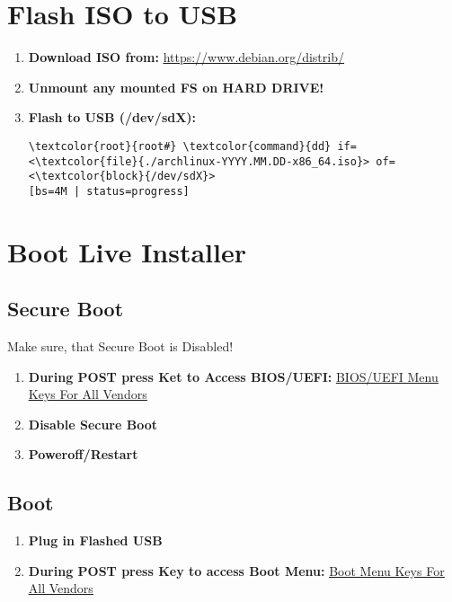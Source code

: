 \documentclass[10pt, a4paper, onecolumn, openany]{book} %
\begin{document}
\section{Flash ISO to USB}
\begin{enumerate}
    \item \textbf{Download ISO from:}
    \newline \underline{\url{https://www.debian.org/distrib/}}
    \item \textbf{Unmount any mounted FS on HARD DRIVE!}
    \item \textbf{Flash to USB (/dev/sdX):}
\begin{Verbatim}[commandchars=\\\{\}]
\textcolor{root}{root#} \textcolor{command}{dd} if=<\textcolor{file}{./archlinux-YYYY.MM.DD-x86_64.iso}> of=<\textcolor{block}{/dev/sdX}> 
[bs=4M | status=progress]
\end{Verbatim}
\end{enumerate}
\section{Boot Live Installer}
\subsection{Secure Boot}
Make sure, that Secure Boot is Disabled!
\begin{enumerate}
    \item \textbf{During POST press Ket to Access BIOS/UEFI:}
\newline \underline{\href{https://techofide.com/blogs/boot-menu-option-keys-for-all-computers-and-laptops-updated-list-2021-techofide/}{BIOS/UEFI Menu Keys For All Vendors}}
    \item \textbf{Disable Secure Boot}
    \item \textbf{Poweroff/Restart}
\end{enumerate}
\subsection{Boot}
\begin{enumerate}
    \item \textbf{Plug in Flashed USB}
    \item \textbf{During POST press Key to access Boot Menu:}
\newline \underline{\href{https://techofide.com/blogs/boot-menu-option-keys-for-all-computers-and-laptops-updated-list-2021-techofide/}{Boot Menu Keys For All Vendors}}
\end{enumerate}
\end{document}
